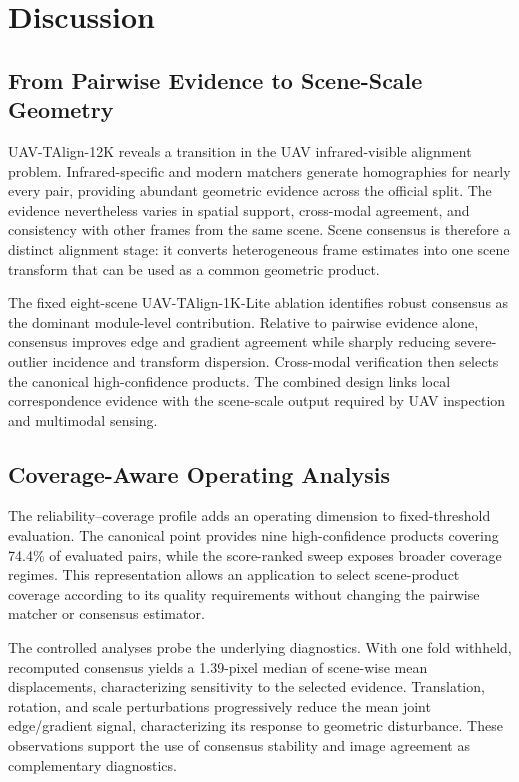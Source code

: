 
\section{Discussion}

\subsection{From Pairwise Evidence to Scene-Scale Geometry}

UAV-TAlign-12K reveals a transition in the UAV infrared-visible alignment problem. Infrared-specific
and modern matchers generate homographies for nearly every pair, providing abundant geometric
evidence across the official split. The evidence nevertheless varies in spatial support,
cross-modal agreement, and consistency with other frames from the same scene. Scene consensus is
therefore a distinct alignment stage: it converts heterogeneous frame estimates into one scene
transform that can be used as a common geometric product.

The fixed eight-scene UAV-TAlign-1K-Lite ablation identifies robust consensus as the dominant
module-level contribution. Relative to pairwise evidence alone, consensus improves edge and
gradient agreement while sharply reducing severe-outlier incidence and transform dispersion.
Cross-modal verification then selects the canonical high-confidence products. The combined design links local
correspondence evidence with the scene-scale output required by UAV inspection and multimodal
sensing.

\subsection{Coverage-Aware Operating Analysis}

The reliability--coverage profile adds an operating dimension to fixed-threshold evaluation. The
canonical point provides nine high-confidence products covering 74.4\% of evaluated pairs, while
the score-ranked sweep exposes broader coverage regimes. This representation allows an application
to select scene-product coverage according to its quality requirements without changing the
pairwise matcher or consensus estimator.

The controlled analyses probe the underlying diagnostics. With one fold withheld, recomputed
consensus yields a 1.39-pixel median of scene-wise mean displacements, characterizing sensitivity to the
selected evidence. Translation, rotation, and scale perturbations progressively reduce the mean
joint edge/gradient signal, characterizing its response to geometric disturbance. These observations
support the use of consensus stability and image agreement as complementary diagnostics.

